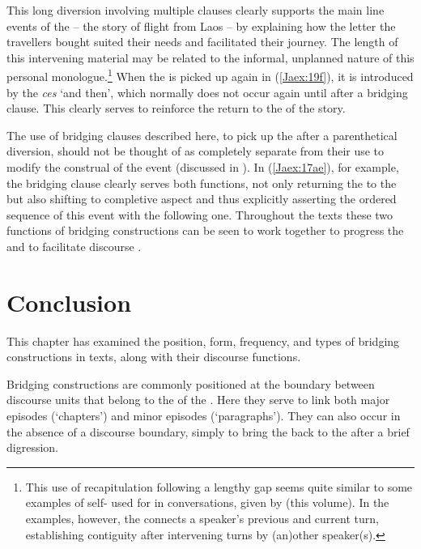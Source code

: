 \documentclass[output=paper]{LSP/langsci}
\begin{document}
This long diversion involving multiple clauses clearly supports the main line events of the  – the story of flight from Laos – by explaining how the letter the travellers bought suited their needs and facilitated their journey. The length of this intervening material may be related to the informal, unplanned nature of this personal monologue.\footnote{ This use of recapitulation following a lengthy gap seems quite similar to some examples of self- used for  in  conversations, given by \citeauthor{alvanoudi18} (this volume). In the  examples, however, the  connects a speaker’s previous and current turn, establishing contiguity after intervening turns by (an)other speaker(s).} When the  is picked up again in (\ref{Jaex:19f}), it is introduced by the   \textit{ces } `and then', which normally does not occur again until after a bridging clause. This clearly serves to reinforce the return to the   of the story.

The use of bridging clauses described here, to pick up the  after a parenthetical diversion, should not be thought of as completely separate from their use to modify the construal of the event (discussed in ). In (\ref{Jaex:17ae}), for example, the bridging clause clearly serves both functions, not only returning the  to the  but also shifting to completive aspect and thus explicitly asserting the ordered sequence of this event with the following one. Throughout the texts these two functions of bridging constructions can be seen to work together to progress the  and to facilitate discourse . 

\section{Conclusion} 
\label{Jasec:Conclusion}

This chapter has examined the position, form, frequency, and types of bridging constructions in   texts, along with their discourse functions. 

Bridging constructions are commonly positioned at the boundary between discourse units that belong to the  of the . Here they serve to link both major episodes (`chapters') and minor episodes (`paragraphs'). They can also occur in the absence of a discourse boundary, simply to bring the  back to the  after a brief digression. 
\end{document}

